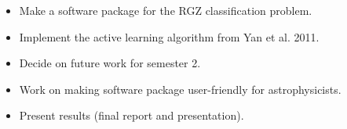 \documentclass[a4paper]{article}
\begin{document}
\begin{itemize}
\begin{itemize}
                    \item Make a software package for the RGZ classification problem.
                    \item Implement the active learning algorithm from Yan et al. 2011.
                    \item Decide on future work for semester 2.
                    \item Work on making software package user-friendly for astrophysicists.
                    \item Present results (final report and presentation).
                \end{itemize}
        \end{itemize}



\end{document}
